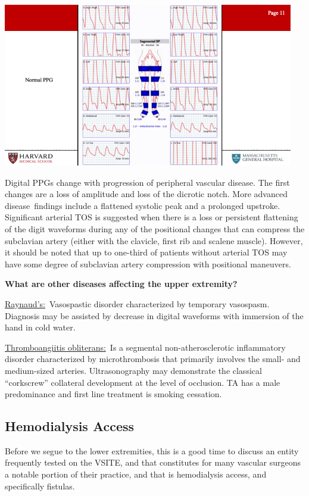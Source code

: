 \documentclass[
]{book}
\begin{document}
\includegraphics[width=5in]{images/vasc_lab/Slide12}

Digital PPGs change with progression of peripheral vascular disease. The
first changes are a loss of amplitude and loss of the dicrotic notch.
More advanced disease~findings include a flattened systolic peak and a
prolonged upstroke. Significant arterial TOS is suggested when there is
a loss or persistent flattening of the digit waveforms during any of the
positional changes that can compress the subclavian artery (either with
the clavicle, first rib and scalene muscle). However, it should be noted
that up to one-third of patients without arterial TOS may have some
degree of subclavian artery compression with positional maneuvers.

\textbf{What are other diseases affecting the upper extremity?}

\underline{Raynaud's:}~Vasospastic disorder characterized by temporary
vasospasm. Diagnosis may be assisted by decrease in digital waveforms
with immersion of the hand in cold water.

\underline{Thromboangiitis obliterans:}~Is a segmental non-atherosclerotic
inflammatory disorder characterized by microthrombosis that primarily
involves the small- and medium-sized arteries. Ultrasonography may
demonstrate the classical ``corkscrew'' collateral development at the
level of occlusion. TA has a male predominance and first line treatment
is smoking cessation.

\hypertarget{hemodialysis-access}{%
\subsection{Hemodialysis Access}\label{hemodialysis-access}}

Before we segue to the lower extremities, this is a good time to discuss
an entity frequently tested on the VSITE, and that constitutes for many
vascular surgeons a notable portion of their practice, and that is
hemodialysis access, and specifically fistulas.
\end{document}
